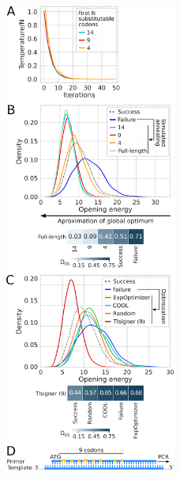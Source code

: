 \begin{figure}
	\includegraphics[width=0.5\textwidth]{appendix/TIsigner/Figs/S10.png}

\end{figure}
